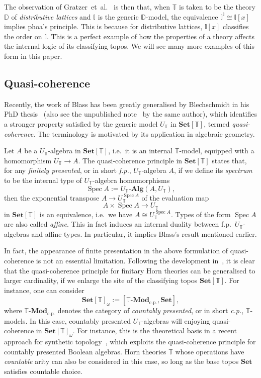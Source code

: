\documentclass[12pt]{amsart}
\theoremstyle{definition}
\newcommand{\mb}[1]{\mathbf{#1}}
\newcommand{\mbb}[1]{\mathbb{#1}}
\newcommand{\T}{\mbb T}
\newcommand{\I}{\mbb I}
\newcommand{\mr}[1]{\mathrm{#1}}
\newcommand{\Set}{\mb{Set}}
\newcommand{\alg}{\text{-}\mb{Alg}}
\newcommand{\cp}{_{\mr{c.p.}}}
\newcommand{\mmod}[1]{#1\text{-}\mathbf{Mod}}
\newcommand{\spec}{\operatorname{Spec}}
\begin{document}

The observation of Gratzer~et~al.~\cite{gratzer2024directed} is then that, when $\T$ is taken to be the theory $\mbb D$ of \emph{distributive lattices} and $\I$ is the generic $\mbb D$-model, the equivalence $\I^\I \cong \I[x]$ implies phoa's principle. This is because for distributive lattices, $\I[x]$ classifies the order on $\I$. This is a perfect example of how the properties of a theory affects the internal logic of its classifying topos. We will see many more examples of this form in this paper.

\subsection{Quasi-coherence}\label{subsec:qc}

Recently, the work of Blass has been greatly generalised by Blechschmidt in his PhD thesis~\cite{blechschmidt2021using} (also see the unpublished note~\cite{blechschmidt2020general} by the same author), which identifies a stronger property satisfied by the generic model $U_\T$ in $\Set[\T]$, termed \emph{quasi-coherence}. The terminology is motivated by its application in algebraic geometry.

Let $A$ be a $U_\T$-algebra in $\Set[\T]$, i.e.\ it is an internal $\T$-model, equipped with a homomorphism $U_\T \to A$. The quasi-coherence principle in $\Set[\T]$ states that, for any \emph{finitely presented}, or in short \emph{f.p.}, $U_\T$-algebra $A$, if we define its \emph{spectrum} to be the internal type of $U_\T$-algebra homomorphisms
\[ \spec A := U_\T\alg(A,U_\T), \]
then the exponential transpose $A\to U_\T^{\spec A}$ of the evaluation map \[ A\times \spec A\to U_\T \]  in $\Set[\T]$ is an equivalence, i.e.\ we have $A \cong U_\T^{\spec A}$.
Types of the form $\spec A$ are also called \emph{affine}. This in fact induces an internal duality between f.p.\ $U_\T$-algebras and affine types. In particular, it implies Blass's result mentioned earlier. 

In fact, the appearance of finite presentation in the above formulation of quasi-coherence is not an essential limitation. Following the development in~\cite{blechschmidt2021using,blechschmidt2020general}, it is clear that the quasi-coherence principle for finitary Horn theories can be generalised to larger cardinality, if we enlarge the site of the classifying topos $\Set[\T]$. For instance, one can consider
\[ \Set[\T]_\omega := [\mmod\T\cp,\Set], \]
where $\mmod\T\cp$ denotes the category of \emph{countably presented}, or in short \emph{c.p.}, $\T$-models. In this case, countably presented $U_\T$-algebras will enjoying quasi-coherence in $\Set[\T]_\omega$. For instance, this is the theoretical basis in a recent approach for synthetic topology~\cite{cherubini2024foundation}, which exploits the quasi-coherence principle for countably presented Boolean algebras. Horn theories $\T$ whose operations have \emph{countable} arity can also be considered in this case, so long as the base topos $\Set$ satisfies countable choice.
\end{document}

